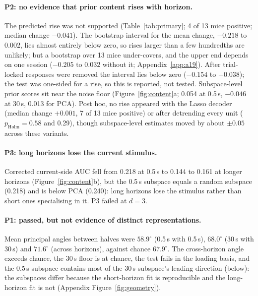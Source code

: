 \documentclass{article}
\newcommand{\holm}{p_{\mathrm{Holm}}}
\begin{document}
\paragraph{P2: no evidence that prior content rises with horizon.} The predicted rise was not supported
(Table~\ref{tab:primary}; 4 of 13 mice positive; median change $-0.041$). The bootstrap interval for the mean change,
$-0.218$ to $0.002$, lies almost entirely below zero, so rises larger than a few hundredths are unlikely; but a
bootstrap over 13 mice under-covers, and the upper end depends on one session ($-0.205$ to $0.032$ without it;
Appendix~\ref{app:a19}). After trial-locked responses were removed the interval lies below zero ($-0.154$ to
$-0.038$); the test was one-sided for a rise, so this is reported, not tested. Subspace-level prior scores sit near
the noise floor (Figure~\ref{fig:content}a; 0.054 at 0.5\,s, $-0.046$ at 30\,s, 0.013 for PCA). Post hoc, no rise
appeared with the Lasso decoder (median change $+0.001$, 7 of 13 mice positive) or after detrending every unit
($\holm = 0.58$ and 0.29), though subspace-level estimates moved by about $\pm0.05$ across these variants.

\paragraph{P3: long horizons lose the current stimulus.} Corrected current-side AUC fell from 0.218 at 0.5\,s to 0.144
to 0.161 at longer horizons (Figure~\ref{fig:content}b), but the 0.5\,s subspace equals a random subspace (0.218) and is
below PCA (0.240): long horizons lose the stimulus rather than short ones specialising in it. P3 failed at $d=3$.

\paragraph{P1: passed, but not evidence of distinct representations.} Mean principal angles between halves were
$58.9^\circ$ (0.5\,s with 0.5\,s), $68.0^\circ$ (30\,s with 30\,s) and $71.6^\circ$ (across horizons), against chance
$67.9^\circ$. The cross-horizon angle exceeds chance, the 30\,s floor is at chance, the test fails in the loading
basis, and the 0.5\,s subspace contains most of the 30\,s subspace's leading direction (below): the subspaces differ
because the short-horizon fit is reproducible and the long-horizon fit is not (Appendix Figure~\ref{fig:geometry}).
\end{document}

